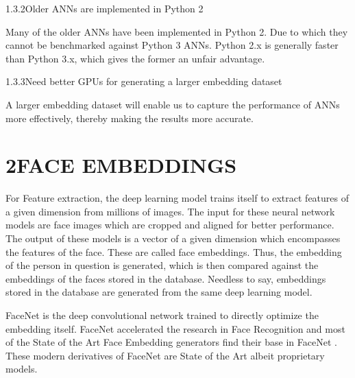 \documentclass[12pt]{article}
\renewcommand{\_}{\kern-1.5pt\textunderscore\kern-1.5pt}
\begin{document}
\vspace{\baselineskip}
1.3.2\tab Older ANNs are implemented in Python 2\par

Many of the older ANNs have been implemented in Python 2. Due to which they cannot be benchmarked against Python 3 ANNs. Python 2.x is generally faster than Python 3.x, which gives the former an unfair advantage.\par


\vspace{\baselineskip}
1.3.3\tab Need better GPUs for generating a larger embedding dataset\par

A larger embedding dataset will enable us to capture the performance of ANNs more effectively, thereby making the results more accurate.\par

\setlength{\parskip}{12.0pt}
\section*{2\hspace*{10pt}FACE EMBEDDINGS}
\begin{justify}
For Feature extraction, the deep learning model trains itself to extract features of a given dimension from millions of images. The input for these neural network models are face images which are cropped and aligned for better performance. The output of these models is a vector of a given dimension which encompasses the features of the face. These are called face embeddings. Thus, the embedding of the person in question is generated, which is then compared against the embeddings of the faces stored in the database. Needless to say, embeddings stored in the database are generated from the same deep learning model.
\end{justify}\par

\begin{justify}
FaceNet  \cite{schroff2015facenet}  is the deep convolutional network trained to directly optimize the embedding itself. FaceNet  \cite{schroff2015facenet}  accelerated the research in Face Recognition and most of the State of the Art Face Embedding generators find their base in FaceNet \cite{schroff2015facenet} . These modern derivatives of FaceNet \cite{schroff2015facenet}  are State of the Art albeit proprietary models.
\end{justify}\par
\end{document}
